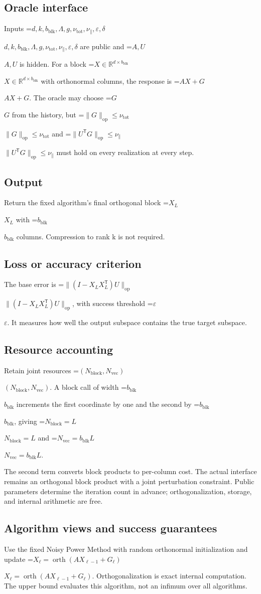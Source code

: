 \documentclass[10pt,a4paper]{article}
\newcommand{\AtlasMath}[1]{\par\begingroup\centering\setbox0=\hbox{$\displaystyle #1$}\ifdim\wd0>1.4\linewidth\typeout{ATLAS WIDE FORMULA: \the\wd0}\fi\ifdim\wd0>\linewidth\resizebox{\linewidth}{!}{\box0}\else\box0\fi\par\endgroup}
\newcommand{\AtlasInlineMath}[1]{\begingroup\setbox0=\hbox{$#1$}\ifdim\wd0>.4\linewidth\endgroup\AtlasMath{#1}\else\endgroup$#1$\fi}
\begin{document}
\subsection{Oracle interface}
Inputs \AtlasInlineMath{d,k,b_{\mathrm{blk}},\Lambda,g,\nu_{\mathrm{tot}},\nu_{\parallel},\varepsilon,\delta} are public and \AtlasInlineMath{A,U} is hidden. For a block \AtlasInlineMath{X\in\mathbb{R}^{d\times b_{\mathrm{blk}}}} with orthonormal columns, the response is \AtlasInlineMath{AX+G}. The oracle may choose \AtlasInlineMath{G} from the history, but \AtlasInlineMath{\|G\|_{\mathrm{op}}\le\nu_{\mathrm{tot}}} and \AtlasInlineMath{\|U^{\mathsf T}G\|_{\mathrm{op}}\le\nu_{\parallel}} must hold on every realization at every step.

\subsection{Output}
Return the fixed algorithm’s final orthogonal block \AtlasInlineMath{X_L} with \AtlasInlineMath{b_{\mathrm{blk}}} columns. Compression to rank k is not required.

\subsection{Loss or accuracy criterion}
The base error is \AtlasInlineMath{\|(I-X_LX_L^{\mathsf T})U\|_{\mathrm{op}}}, with success threshold \AtlasInlineMath{\varepsilon}. It measures how well the output subspace contains the true target subspace.

\subsection{Resource accounting}
Retain joint resources \AtlasInlineMath{(N_{\mathrm{block}},N_{\mathrm{vec}})}. A block call of width \AtlasInlineMath{b_{\mathrm{blk}}} increments the first coordinate by one and the second by \AtlasInlineMath{b_{\mathrm{blk}}}, giving \AtlasInlineMath{N_{\mathrm{block}}=L} and \AtlasInlineMath{N_{\mathrm{vec}}=b_{\mathrm{blk}}L}.

The second term converts block products to per-column cost. The actual interface remains an orthogonal block product with a joint perturbation constraint. Public parameters determine the iteration count in advance; orthogonalization, storage, and internal arithmetic are free.

\subsection{Algorithm views and success guarantees}
Use the fixed Noisy Power Method with random orthonormal initialization and update \AtlasInlineMath{X_{\ell}=\operatorname{orth}(AX_{\ell-1}+G_{\ell})}. Orthogonalization is exact internal computation. The upper bound evaluates this algorithm, not an infimum over all algorithms.
\end{document}
